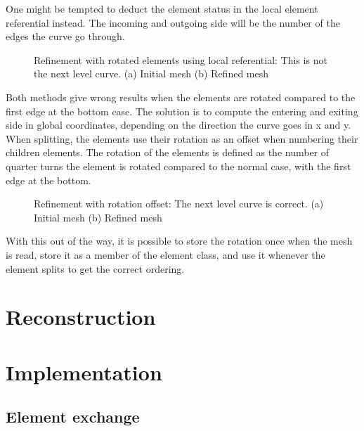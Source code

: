 One might be tempted to deduct the element status in the local element referential instead. The
incoming and outgoing side will be the number of the edges the curve go through. 

\begin{figure}[H]
	\centering
	\hfill
	\caption{Refinement with rotated elements using local referential: This is not the next level curve. (a) Initial mesh (b) Refined mesh}
	\label{fig:hilbert_local}
\end{figure}

Both methods give wrong results when the elements are rotated compared to the first edge at the
bottom case. The solution is to compute the entering and exiting side in global coordinates,
depending on the direction the curve goes in x and y. When splitting, the elements use their
rotation as an offset when numbering their children elements. The rotation of the elements is
defined as the number of quarter turns the element is rotated compared to the normal case, with the
first edge at the bottom.

\begin{figure}[H]
	\centering
	\hfill
	\caption{Refinement with rotation offset: The next level curve is correct. (a) Initial mesh (b) Refined mesh}
	\label{fig:hilbert_correct}
\end{figure}

With this out of the way, it is possible to store the rotation once when the mesh is read, store it
as a member of the element class, and use it whenever the element splits to get the correct
ordering. 

\section{Reconstruction} \label{section:load_balancing:reconstruction}

\section{Implementation} \label{section:load_balancing:implementation}
\subsection{Element exchange} \label{section:load_balancing:implementation:element_exchange}
